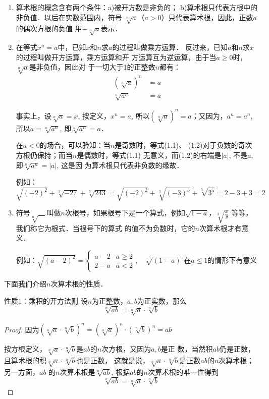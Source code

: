 \begin{enumerate}
    \item 算术根的概念含有两个条件：a)被开方数是非负的；
b)算术根只代表方根中的非负值．以后在实数范围内，符号
$\sqrt[n]{a}$（$a>0$）只代表算术根，因此，正数$a$的偶次方根的负值
用$-\sqrt[n]{a}$表示．
\item 在等式$x^n=a$中，已知$x$和$n$求$a$的过程叫做乘方运算．
反过来，已知$a$和$n$求$x$的过程叫做开方运算，乘方运算和开
方运算互为逆运算，由于当$a\ge 0$时，$\sqrt[n]{a}$是非负值，因此对
于一切大于1的正整数$n$都有：
\begin{align}
    \left(\sqrt[n]{a}\right)^n&=a\\
    \sqrt[n]{a^n}&=a
\end{align}

事实上，设$\sqrt[n]{a}=x$, 按定义，$x^n=a$, 所以$\left(\sqrt[n]{a}\right)^n=a$；又因为，$a^n=a^n$, 所以$a=\sqrt[n]{a^n}$, 即$\sqrt[n]{a^n}=a$．

在$a<0$的场合，可以验知：当$n$是奇数时，等式(1.1)、
(1.2)对于负数的奇次方根仍保持；而当$n$是偶数时，等式(1.1)
无意义，而(1.2)的右端是$|a|$, 不是$a$, 即$\sqrt[n]{a^n}=|a|$, 这是因
为算术根只代表非负数的缘故．

例如：$\sqrt{(-2)^2}+\sqrt[3]{-27}+\sqrt[5]{243}=\sqrt{(-2)^2}+\sqrt[3]{(-3)^3}+\sqrt[5]{3^5}=2-3+3=2$

\item 符号$\sqrt[n]{\quad }$叫做$n$次根号，如果根号下是一个算式，例如$\sqrt{1-a}$，$\sqrt[3]{\frac{x}{y}}$
等等，我们称它为根式．当根号下的算式
的值不为负数时，它的$n$次算术根才有意义．

例如：$\sqrt{(a-2)^2}=\begin{cases}
    a-2 & a\ge 2\\
    2-a & a<2
\end{cases},\quad \sqrt{(1-a)} \text{ 在$a\le 1$的情形下有意义}$

\end{enumerate}

下面我们介绍$n$次算术根的性质．

\begin{blk}{性质1：乘积的开方法则}
设$n$为正整数，$a,b$为正实数，那么
$$\sqrt[n]{ab}=\sqrt[n]{a}\cdot \sqrt[n]{b}$$
\end{blk}

\begin{proof}
    因为$\left(\sqrt[n]{a}\cdot \sqrt[n]{b}\right)^n=\left(\sqrt[n]{a}\right)^n\cdot \left(\sqrt[n]{b}\right)^n=ab$
    
    按方根定义，$\sqrt[n]{a}\cdot \sqrt[n]{b}$是$ab$的$n$次方根，又因为$a,b$是正
    数，当然积$ab$仍是正数，且算术根的积$\sqrt[n]{a}\cdot \sqrt[n]{b}$也是正数，
    这就是说，$\sqrt[n]{a}\cdot \sqrt[n]{b}$是正数$ab$的$n$次算术根；另一方面，$ab$
    的$n$次算术根是$\sqrt[n]{ab}$, 根据$ab$的$n$次算术根的唯一性得到
    $$\sqrt[n]{ab}=\sqrt[n]{a}\cdot \sqrt[n]{b}$$
\end{proof}

